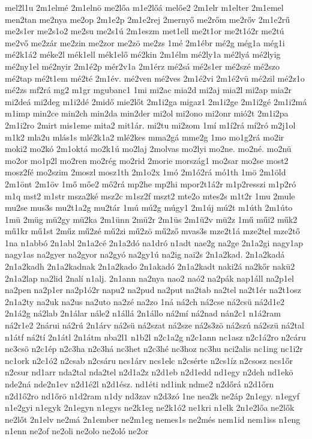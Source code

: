 {mel2l1u
2m1elmé
2m1elnö
me2lőa
m1e2lőá
melőe2
2m1elr
m1elter
2m1emel
men2tan
me2nya
me2op
2m1e2p
2m1e2rej
2mernyő
me2rőm
me2rőv
2m1e2rű
me2s1er
me2s1o2
me2su
me2s1ú
2m1eszm
met1ell
me2t1or
me2t1ó2r
me2tú
me2vő
me2zár
me2zin
me2zor
me2zö
me2zs
1mé
2m1ébr
mé2g
még1a
még1i
mé2k1á2
méke2l
mék1ell
mék1elő
mé2kin
2m1élm
mé2ly1a
mé2lyá
mé2lyig
mé2ny1el
mé2nyir
2m1é2p
mér2v1a
2m1érz
mé2sá
mé2s1er
mé2szé
mé2szo
mé2tap
mé2t1em
mé2té
2m1év.
mé2ven
mé2ves
2m1é2vi
2m1é2vü
mé2zil
mé2z1o
mé2zs
mf2rá
mg2
m1gr
mgubanc1
1mi
mi2ac
mia2d
mi2aj
mia2l
mi2ap
mia2r
mi2deá
mi2deg
m1i2dé
2midő
mie2lőt
2m1i2ga
migaz1
2m1i2ge
2m1i2gé
2m1i2má
m1imp
min2ce
min2ch
min2da
min2der
mi2ol
mi2ono
mi2onr
mió2t
2m1i2pa
2m1i2ro
2mirt
mis1eme
mita2
mit1ár.
mi2tu
mi2zom
1mí
m1í2rá
mí2ró
m2j1ol
m1k2
mla2u
mlás1s
mlé2k1a2
mlé2kes
mma2gá
mme2g
1mo
mo1g2rá
mo2ir
moki2
mo2kó
2m1oktá
mo2k1ú
mo2laj
2molvas
mo2lyi
mo2ne.
mo2né.
mo2nü
mo2or
mo1p2l
mo2ren
mo2rég
mo2rid
2morie
mország1
mo2sar
mo2se
most2
mosz2fé
mo2szim
2moszl
mosz1th
2m1o2x
1mó
2m1ó2rá
mó1th
1mö
2m1öld
2m1önt
2m1öv
1mő
mőe2
mő2rá
mp2he
mp2hi
mpor2t1á2r
m1p2resszi
m1p2ró
m1q
mst2
m1str
msza2ké
msz2c
m1sz2f
mszt2
mte2o
mtes2s
m1t2r
1mu
2mule
mu2se
mus3s
mu2t1a2g
mu2tár
1mú
mú2g
múgy1
2m1új
mú2t
m1úth
2m1úto
1mü
2müg
mü2gy
mü2ka
2m1ünn
2mü2r
2m1üs
2m1ü2v
mü2z
1mű
műi2
műk2
mű1kr
mű1st
2műz
mű2zé
mű2zi
mű2zö
mű2ző
mvas3s
mze2t1á
mze2tel
mze2tő
1na
n1abbó
2n1abl
2n1a2cé
2n1a2dó
na1dró
n1adt
nae2g
na2ge
2n1a2gi
nagy1ap
nagy1as
na2gyer
na2gyor
na2gyó
na2gy1ú
na2ig
nai2s
2n1a2kad.
2n1a2kadá
2n1a2kadh
2n1a2kadnak
2n1a2kado
2n1akadó
2n1a2kadt
naki2á
na2kőr
nakü2
2n1a2lap
na2lid
2nalí
n1alj.
2n1ann
na2nya
nao2
naó2
na2pák
nap1áll
na2p1el
na2pen
na2p1er
na2p1ó2r
napu2
na2pud
na2put
na2tab
na2tel
na2t1ér
na2t1osz
2n1a2ty
na2uk
na2us
na2uto
na2zé
na2zo
1ná
ná2ch
ná2cse
ná2csü
ná2d1e2
2n1á2g
ná2lab
2n1álar
nále2
n1állá
2n1állo
ná2mí
ná2nad
nán2c1
n1á2ram
ná2r1e2
2nárui
ná2rú
2n1árv
ná2sü
ná2szat
ná2sze
ná2s3zö
ná2szú
ná2szü
ná2tal
n1átf
ná2tí
2n1átl
2n1átm
nba2l1
n1b2l
n2c1a2g
n2c1ann
nc1asz
n2c1á2ro
n2cáru
nc3csö
n2c1ép
n2c3ha
n2c3há
nc3het
n2c3hé
nc3hoz
nc3hu
nci2alis
nc1ing
nc1i2r
nc1ork
n2c1ó2
n2csab
n2csáru
ncs1árv
ncs1elc
n2csérte
n2cs1íz
n2csosz
ncs1őr
n2csur
nd1arr
nda2tal
nda2tel
n2d1a2z
n2d1eb
n2d1edd
nd1egy
n2deh
nd1ekö
nde2ná
nde2n1ev
n2d1é2l
n2d1ész.
nd1éti
nd1ink
ndme2
n2dőrá
n2d1őrn
n2d1ő2ro
nd1őrö
n1d2ram
n1dy
nd3zav
n2d3zó
1ne
nea2k
ne2áp
2n1egy.
n1egyf
n1e2gyi
n1egyk
2n1egyn
n1egys
ne2k1eg
ne2k1ó2
ne1kri
n1elk
2n1e2lőa
ne2lők
ne2lőt
2n1elv
ne2má
2n1ember
ne2m1eg
nemes1s
ne2més
nem1id
nem1iss
n1eng
n1enn
ne2of
ne2oli
ne2olo
ne2oló
ne2or
}
